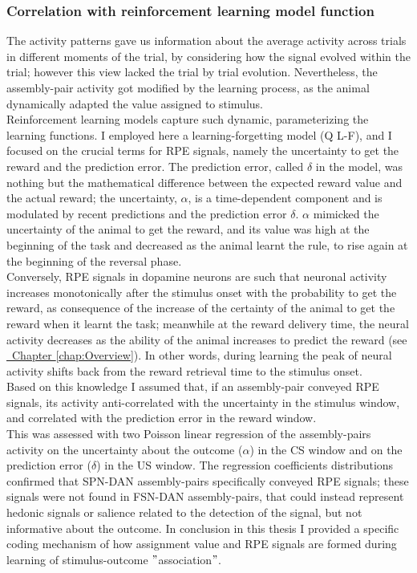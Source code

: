 \subsubsection{Correlation with reinforcement learning model function}
The activity patterns gave us information about the average activity across trials in different moments of the trial, by considering how the signal evolved within the trial; however this view lacked the trial by trial evolution. Nevertheless, the assembly-pair activity got modified by the learning process, as the animal dynamically adapted the value assigned to stimulus.\\Reinforcement learning models capture such dynamic, parameterizing the learning functions. I employed here a learning-forgetting model (Q L-F), and I focused on the crucial terms for RPE signals, namely the uncertainty to get the reward and the prediction error. The prediction error, called $\delta$ in the model, was nothing but the mathematical difference between the expected reward value and the actual reward; the uncertainty, $\alpha$, is a time-dependent component and is modulated by recent predictions and the prediction error $\delta$. $\alpha$ mimicked the uncertainty of the animal to get the reward, and its value was high at the beginning of the task and decreased as the animal learnt the rule, to rise again at the beginning of the reversal phase.\\Conversely, RPE signals in dopamine neurons are such that neuronal activity increases monotonically after the stimulus onset with the probability to get the reward, as consequence of the increase of the certainty of the animal to get the reward when it learnt the task; meanwhile at the reward delivery time, the neural activity decreases as the ability of the animal increases to predict the reward (see \hyperref[chap:Overview]{~Chapter \ref*{chap:Overview}}). In other words, during learning the peak of neural activity shifts back from the reward retrieval time to the stimulus onset.\\Based on this knowledge I assumed that, if an assembly-pair conveyed RPE signals, its activity anti-correlated with the uncertainty in the stimulus window, and correlated with the prediction error in the reward window.\\This was assessed with two Poisson linear regression of the assembly-pairs activity on the uncertainty about the outcome ($\alpha$) in the CS window and on the prediction error ($\delta$) in the US window. The regression coefficients distributions confirmed that SPN-DAN assembly-pairs specifically conveyed RPE signals; these signals were not found in FSN-DAN assembly-pairs, that could instead represent hedonic signals or salience related to the detection of the signal, but not informative about the outcome. In conclusion in this thesis I provided a specific coding mechanism of how assignment value and RPE signals are formed during learning of stimulus-outcome $"$association$"$.

